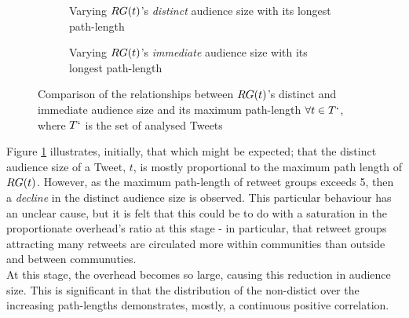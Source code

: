 \begin{figure}[h]
\begin{subfigure}{.5\textwidth}
    \centering
    \caption{Varying $RG(t)$'s \textit{distinct} audience size with its longest path-length}
    \label{fig:pathlength-audience}
\end{subfigure}
\quad
\begin{subfigure}{.5\textwidth}
    \centering
    \caption{Varying $RG(t)$'s \textit{immediate} audience size with its longest path-length}
    \label{fig:pathlength-immediateaudience}
\end{subfigure}
\caption{Comparison of the relationships between $RG(t)$'s distinct and immediate audience size and its maximum path-length $\forall t \in T`$, where $T`$ is the set of analysed Tweets}
\end{figure}

Figure \ref{fig:pathlength-audience} illustrates, initially, that which might be expected; that the distinct audience size of a Tweet, $t$, is mostly proportional to the maximum path length of $RG(t)$. However, as the maximum path-length of retweet groups exceeds 5, then a \textit{decline} in the distinct audience size is observed. This particular behaviour has an unclear cause, but it is felt that this could be to do with a saturation in the proportionate overhead's ratio at this stage - in particular, that retweet groups attracting many retweets are circulated more within communities than outside and between communuties.\\
At this stage, the overhead becomes so large, causing this reduction in audience size. This is significant in that the distribution of the non-distict over the increasing path-lengths demonstrates, mostly, a continuous positive correlation.

